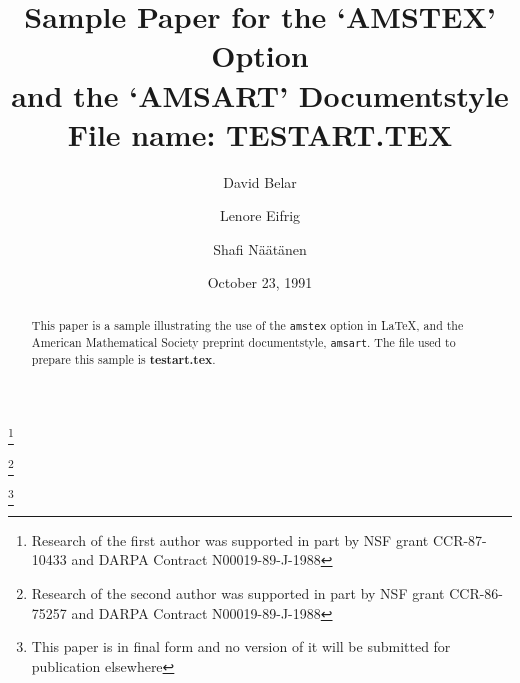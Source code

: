 


\title[AMSTEX Option Sample Paper]
{Sample Paper for the `AMSTEX' Option\\
and the `AMSART' Documentstyle\\
File name: TESTART.TEX}

\author{David Belar}
\address{Department of Electrical Engineering\\
        University of Minnesota\\ Minneapolis, Minnesota 55455}
\thanks{Research of the first author was supported in part by NSF grant
CCR-87-10433 and DARPA Contract N00019-89-J-1988}

\author{Lenore Eifrig}
\address{Department of Mathematics\\Indiana University\\
        Bloomington, Indiana 47405}
\thanks{Research of the second author was supported in part by NSF
grant CCR-86-75257 and DARPA Contract N00019-89-J-1988}

\author{Shafi N\"a\"at\"anen}
\address{MIT Laboratory for Computer Science \\
        545 Technology Square\\ Cambridge, MA 02139}

\date{October 23, 1991}




\thanks{This paper is in final form and no version of it will be
submitted for publication elsewhere}

\maketitle

\begin{abstract}
This paper is a sample illustrating  the use of the {\tt amstex}
option in \LaTeX{}, and the American Mathematical Society preprint
documentstyle, {\tt amsart}.
The file used to prepare this sample is {\bf testart.tex}.
\end{abstract}

